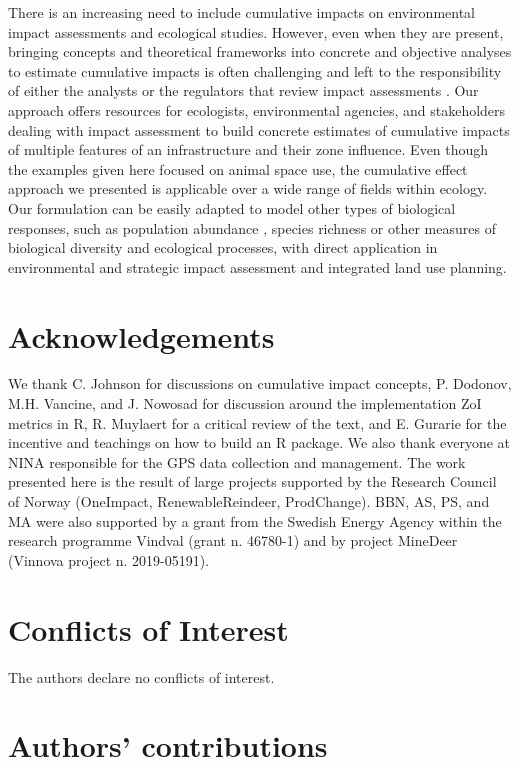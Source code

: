 \documentclass[titlepage]{article}
\begin{document}
There is an increasing need to include cumulative impacts on environmental impact assessments and ecological studies. However, even when they are present, bringing concepts and theoretical frameworks into concrete and objective analyses to estimate cumulative impacts is often challenging and left to the responsibility of either the analysts or the regulators that review impact assessments \citep{johnson_regulating_2011}. Our approach offers resources for ecologists, environmental agencies, and stakeholders dealing with impact assessment to build concrete estimates of cumulative impacts of multiple features of an infrastructure and their zone influence. 
Even though the examples given here focused on animal space use, the cumulative effect approach we presented is applicable over a wide range
of fields within ecology. Our formulation can be easily adapted to model other types of biological responses, such as population abundance \citep[e.g.][]{benitez-lopez_impacts_2010}, species richness \citep[e.g.][]{ficetola_ecological_2009} or other measures of biological diversity and ecological processes, with direct application in environmental and strategic impact assessment and integrated land use planning.
      
\section*{Acknowledgements}

We thank C. Johnson for discussions on cumulative impact concepts, P. Dodonov, M.H. Vancine, and J. Nowosad for discussion around the implementation ZoI metrics in R, R. Muylaert for a critical review of the text, and E. Gurarie for the incentive and teachings on how to build an R package. We also thank everyone at NINA responsible for the GPS data collection and management. The work presented here is the result of large projects supported by the Research Council of Norway (OneImpact, RenewableReindeer, ProdChange). BBN, AS, PS, and MA were also supported by a grant from the Swedish Energy Agency within the research programme Vindval (grant n. 46780-1) and by project MineDeer (Vinnova project n. 2019-05191).

\section*{Conflicts of Interest}

The authors declare no conflicts of interest.

\section*{Authors’ contributions}
\end{document}
